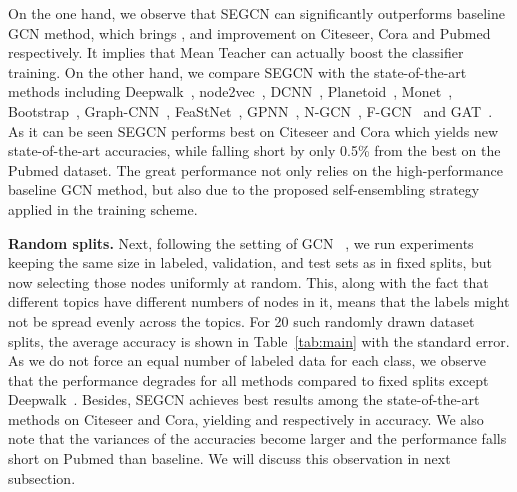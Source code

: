 \documentclass[letterpaper]{article} \usepackage{aaai19}  \usepackage{times}  \usepackage{helvet}  \usepackage{courier}  \usepackage{url}  \usepackage{graphicx}  \usepackage{algorithm}
\begin{document}
On the one hand, we observe that SEGCN can significantly outperforms baseline GCN method, which brings ,  and  improvement on Citeseer, Cora and Pubmed respectively. It implies that Mean Teacher can actually boost the classifier training. On the other hand, we compare SEGCN with the state-of-the-art methods including Deepwalk~\cite{perozzi2014deepwalk}, node2vec~\cite{grover2016node2vec}, DCNN~\cite{atwood2016DCNN}, Planetoid~\cite{yang2016revisiting}, Monet~\cite{monti2017Monet}, Bootstrap~\cite{buchnik2017bootstrapped}, Graph-CNN~\cite{such2017GraphCNN}, FeaStNet~\cite{verma2018feastnet}, GPNN~\cite{liao2018GPNN}, N-GCN~\cite{abu2018N-GCN},  F-GCN~\cite{vijayan2018F-GCN} and GAT~\cite{veličković2018GAT}. As it can be seen SEGCN performs best on Citeseer and Cora which yields new state-of-the-art accuracies, while falling short by only 0.5\% from the best on the Pubmed dataset. The great performance not only relies on the high-performance baseline GCN method, but also due to the proposed self-ensembling strategy applied in the training scheme.

\textbf{Random splits.} Next, following the setting of GCN~\cite{kipf2016semi} , we run experiments keeping the same size in labeled, validation, and test sets as in fixed splits, but now selecting those nodes uniformly at random. This, along with the fact that different topics have different numbers of nodes in it, means that the labels might not be spread evenly across the topics. For 20 such randomly drawn dataset splits, the average accuracy is shown in Table~\ref{tab:main} with the standard error. As we do not force an equal number of labeled data for each class, we observe that the performance degrades for all methods compared to fixed splits except Deepwalk~\cite{perozzi2014deepwalk}. Besides, SEGCN achieves best results among the state-of-the-art methods on Citeseer and Cora, yielding  and  respectively in accuracy. We also note that the variances of the accuracies become larger and the performance falls short on Pubmed than baseline. We will discuss this observation in next subsection.
\end{document}
